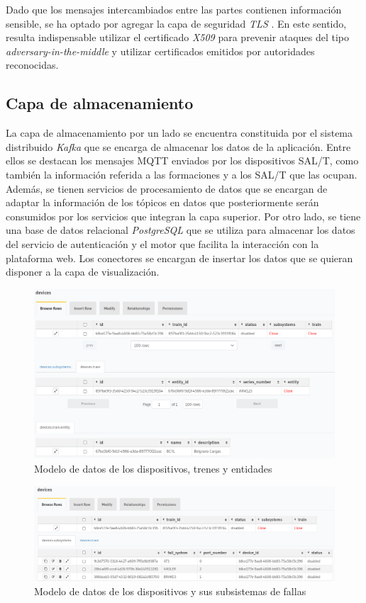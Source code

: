 \documentclass[a4paper]{IEEEtran}
\begin{document}
Dado que los mensajes intercambiados entre las partes contienen información sensible, se ha optado por agregar la capa de seguridad \textit{TLS} \cite{b8}. En este sentido, resulta indispensable utilizar el certificado \textit{X509} \cite{b9} para prevenir ataques del tipo \textit{adversary-in-the-middle} \cite{b10} y utilizar certificados emitidos por autoridades reconocidas.


\subsection{Capa de almacenamiento}

La capa de almacenamiento por un lado se encuentra constituida por el sistema distribuido \textit{Kafka} que se encarga de almacenar los datos de la aplicación. Entre ellos se destacan los mensajes MQTT enviados por los dispositivos SAL/T, como también la información referida a las formaciones y a los SAL/T que las ocupan. \\

Además, se tienen servicios de procesamiento de datos que se encargan de adaptar la información de los tópicos en datos que posteriormente serán consumidos por los servicios que integran la capa superior. Por otro lado, se tiene una base de datos relacional \textit{PostgreSQL} \cite{b11} que se utiliza para almacenar los datos del servicio de autenticación y el motor que facilita la interacción con la plataforma web. Los conectores se encargan de insertar los datos que se quieran disponer a la capa de visualización.

\begin{figure}[ht]
\centering 
\includegraphics[width=.5\textwidth]{images/hasura.png}
\caption{Modelo de datos de los dispositivos, trenes y entidades}
\label{fig:devicesTrainEntity}
\end{figure}

\begin{figure}[ht]
\centering 
\includegraphics[width=.5\textwidth]{images/fail_system_2.png}
\caption{Modelo de datos de los dispositivos y sus subsistemas de fallas}
\label{fig:devicesSubsystems}
\end{figure}
\end{document}
